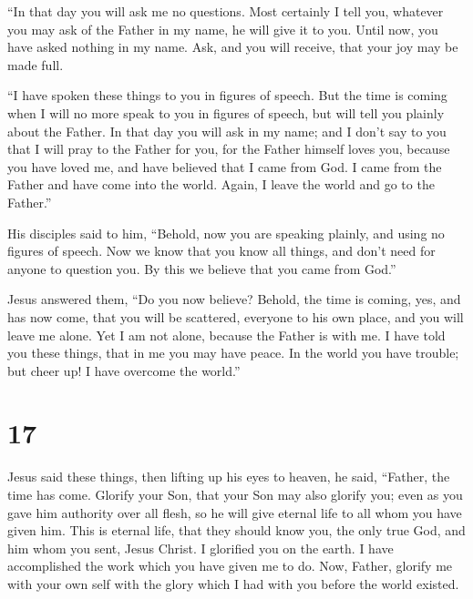  ``In that day you will ask me no questions. Most certainly
I tell you, whatever you may ask of the Father in my name, he will give
it to you.  Until now, you have asked nothing in my name.
Ask, and you will receive, that your joy may be made full.

 ``I have spoken these things to you in figures of speech.
But the time is coming when I will no more speak to you in figures of
speech, but will tell you plainly about the Father.  In
that day you will ask in my name; and I don't say to you that I will
pray to the Father for you,  for the Father himself loves
you, because you have loved me, and have believed that I came from God.
 I came from the Father and have come into the world.
Again, I leave the world and go to the Father.''

 His disciples said to him, ``Behold, now you are speaking
plainly, and using no figures of speech.  Now we know that
you know all things, and don't need for anyone to question you. By this
we believe that you came from God.''

 Jesus answered them, ``Do you now believe? 
Behold, the time is coming, yes, and has now come, that you will be
scattered, everyone to his own place, and you will leave me alone. Yet I
am not alone, because the Father is with me.  I have told
you these things, that in me you may have peace. In the world you have
trouble; but cheer up! I have overcome the world.''

\hypertarget{section-16}{%
\section{17}\label{section-16}}

 Jesus said these things, then lifting up his eyes to
heaven, he said, ``Father, the time has come. Glorify your Son, that
your Son may also glorify you;  even as you gave him
authority over all flesh, so he will give eternal life to all whom you
have given him.  This is eternal life, that they should know
you, the only true God, and him whom you sent, Jesus Christ.
 I glorified you on the earth. I have accomplished the work
which you have given me to do.  Now, Father, glorify me with
your own self with the glory which I had with you before the world
existed.

